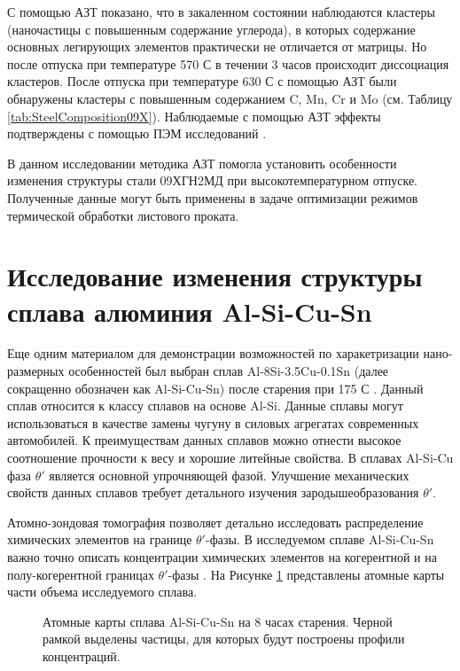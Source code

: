 \FloatBarrier
С помощью АЗТ показано, что в закаленном состоянии наблюдаются кластеры (наночастицы с повышенным содержание углерода), в которых содержание основных легирующих элементов практически не отличается от матрицы. Но после отпуска при температуре 570 \textdegree С в течении 3 часов происходит диссоциация кластеров. После отпуска при температуре 630 \textdegree С с помощью АЗТ были обнаружены кластеры с повышенным содержанием C, Mn, Cr и Mo (см. Таблицу \cref{tab:SteelComposition09X}). Наблюдаемые с помощью АЗТ эффекты подтверждены с помощью ПЭМ исследований \cite{scbibGlubev}.

В данном исследовании методика АЗТ помогла установить особенности изменения структуры стали 09ХГН2МД при высокотемпературном отпуске. Полученные данные могут быть применены в задаче оптимизации режимов термической обработки листового проката.

\FloatBarrier

\section{Исследование изменения структуры сплава алюминия Al-Si-Cu-Sn}\label{sec:ch4/sect4}


Еще одним материалом для демонстрации возможностей по харакетризации нано-размерных особенностей был выбран сплав Al-8Si-3.5Cu-0.1Sn (далее сокращенно обозначен как Al-Si-Cu-Sn) после старения при 175 \textdegree С \cite{Akopyan2022A319}. Данный сплав относится к классу сплавов на основе Al-Si. Данные сплавы могут использоваться в качестве замены чугуну в силовых агрегатах современных автомобилей. К преимуществам данных сплавов можно отнести высокое соотношение прочности к весу и хорошие литейные свойства. В сплавах Al-Si-Cu фаза $\theta '$ является основной упрочняющей фазой. Улучшение механических свойств данных сплавов требует детального изучения зародышеобразования $\theta '$. 

Атомно-зондовая томография позволяет детально исследовать распределение химических элементов на границе $\theta '$-фазы. В исследуемом сплаве Al-Si-Cu-Sn важно точно описать концентрации химических элементов на когерентной и на полу-когерентной границах  $\theta '$-фазы \cite{Akopyan2022A319}. На Рисунке \cref{fig:AlCu_atom_maps} представлены атомные карты части объема исследуемого сплава.

\begin{figure}[htb]
	\caption{Атомные карты сплава Al-Si-Cu-Sn на 8 часах старения. Черной рамкой выделены частицы, для которых будут построены профили концентраций.}
	\label{fig:AlCu_atom_maps}
\end{figure}


